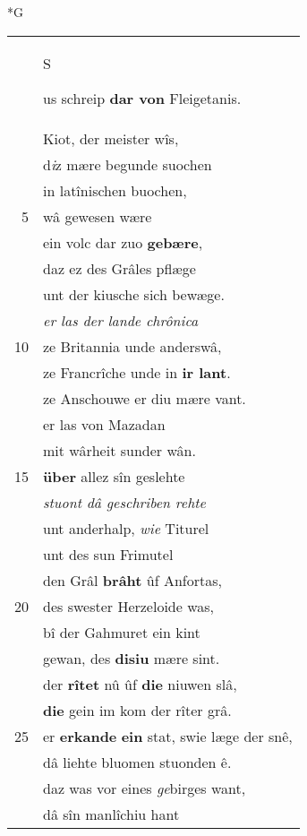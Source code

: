 \documentclass[8pt,a4paper,notitlepage]{article}
\begin{document}
\begin{table}[ht]
\begin{minipage}[t]{0.5\linewidth}
\small
\begin{center}*G
\end{center}
\begin{tabular}{rl}
 & \begin{large}S\end{large}us schreip \textbf{dar von} Fleigetanis.\\ 
 & Kiot, der meister wîs,\\ 
 & d\textit{i}z mære begunde suochen\\ 
 & in latînischen buochen,\\ 
5 & wâ gewesen wære\\ 
 & ein volc dar zuo \textbf{gebære},\\ 
 & daz ez des Grâles pflæge\\ 
 & unt der kiusche sich bewæge.\\ 
 & \textit{er las der lande chrônica}\\ 
10 & ze Britannia unde anderswâ,\\ 
 & ze Francrîche unde in \textbf{ir lant}.\\ 
 & ze Anschouwe er diu mære vant.\\ 
 & er las von Mazadan\\ 
 & mit wârheit sunder wân.\\ 
15 & \textbf{über} allez sîn geslehte\\ 
 & \textit{stuont dâ geschriben rehte}\\ 
 & unt anderhalp, \textit{wie} Titurel\\ 
 & unt des sun Frimutel\\ 
 & den Grâl \textbf{brâht} ûf Anfortas,\\ 
20 & des swester Herzeloide was,\\ 
 & bî der Gahmuret ein kint\\ 
 & gewan, des \textbf{disiu} mære sint.\\ 
 & der \textbf{rîtet} nû ûf \textbf{die} niuwen slâ,\\ 
 & \textbf{die} gein im kom der rîter grâ.\\ 
25 & er \textbf{erkande} \textbf{ein} stat, swie læge der snê,\\ 
 & dâ liehte bluomen stuonden ê.\\ 
 & daz was vor eines \textit{ge}birges want,\\ 
 & dâ sîn manlîchiu hant\\ 

\end{tabular}
\end{minipage}
\end{table}
\end{document}
